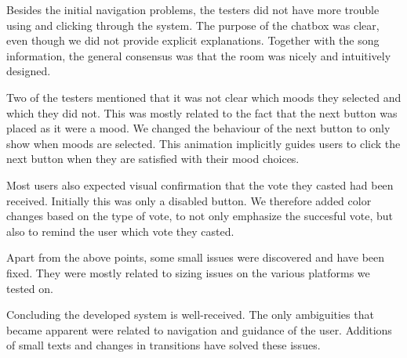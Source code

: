 Besides the initial navigation problems, the testers did not have more trouble using and clicking through the system.
The purpose of the chatbox was clear, even though we did not provide explicit explanations.
Together with the song information, the general consensus was that the room was nicely  and intuitively designed.

Two of the testers mentioned that it was not clear which moods they selected and which they did not.
This was mostly related to the fact that the next button was placed as it were a mood.
We changed the behaviour of the next button to only show when moods are selected.
This animation implicitly guides users to click the next button when they are satisfied with their mood choices.

Most users also expected visual confirmation that the vote they casted had been received.
Initially this was only a disabled button.
We therefore added color changes based on the type of vote, to not only emphasize the succesful vote, but also to remind the user which vote they casted.

Apart from the above points, some small issues were discovered and have been fixed.
They were mostly related to sizing issues on the various platforms we tested on.

Concluding the developed system is well-received.
The only ambiguities that became apparent were related to navigation and guidance of the user.
Additions of small texts and changes in transitions have solved these issues.